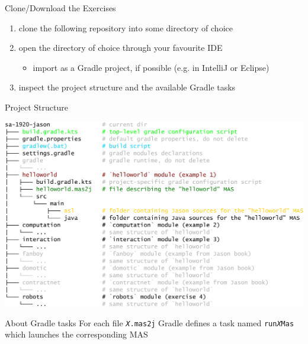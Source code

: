 \documentclass[presentation]{beamer}\mode<presentation>{\usetheme{AMSBolognaFC}}
\begin{document}
\begin{frame}[c]{Clone/Download the Exercises}
    \begin{enumerate}	
        \item clone the following repository into some directory of choice
        \begin{center}
        \end{center}
    
        \vfill
    
        \item open the directory of choice through your favourite IDE
        \begin{itemize}
            \item import as a Gradle project, if possible (e.g. in IntelliJ or Eclipse)
        \end{itemize}
        
        \vfill
        
        \item inspect the project structure and the available Gradle tasks
    \end{enumerate}
\end{frame}

\begin{frame}[c]{Project Structure}

\centering
\includegraphics[width=.7\linewidth]{figures/project-structure.pdf}

\begin{block}{About Gradle tasks}
    For each file \texttt{\textit{X}.mas2j} Gradle defines a task named \alert{\texttt{run\textit{X}Mas}} which launches the corresponding \jason{} MAS
\end{block}

\end{frame}
\end{document}
